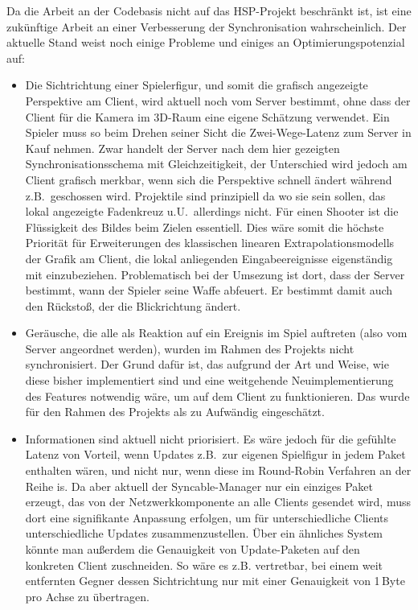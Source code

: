 Da die Arbeit an der Codebasis nicht auf das HSP-Projekt beschränkt ist, ist eine zukünftige Arbeit an einer Verbesserung der Synchronisation wahrscheinlich. Der aktuelle Stand weist noch einige Probleme und einiges an Optimierungspotenzial auf:
\begin{itemize}
\item Die Sichtrichtung einer Spielerfigur, und somit die grafisch angezeigte Perspektive am Client, wird aktuell noch vom Server bestimmt, ohne dass der Client für die Kamera im 3D-Raum eine eigene Schätzung verwendet. 
Ein Spieler muss so beim Drehen seiner Sicht die Zwei-Wege-Latenz zum Server in Kauf nehmen. Zwar handelt der Server nach dem hier gezeigten Synchronisationsschema mit Gleichzeitigkeit, der Unterschied wird jedoch am Client grafisch merkbar, wenn sich die Perspektive schnell ändert während z.B.~geschossen wird. Projektile sind prinzipiell da wo sie sein sollen, das lokal angezeigte Fadenkreuz u.U.~allerdings nicht. Für einen Shooter ist die Flüssigkeit des Bildes  beim Zielen essentiell.
Dies wäre somit die höchste Priorität für Erweiterungen des klassischen linearen Extrapolationsmodells der Grafik am Client, die lokal anliegenden Eingabeereignisse eigenständig mit einzubeziehen. Problematisch bei der Umsezung ist dort, dass der Server bestimmt, wann der Spieler seine Waffe abfeuert. Er bestimmt damit auch den Rückstoß, der die Blickrichtung ändert.
\item Geräusche, die alle als Reaktion auf ein Ereignis im Spiel auftreten (also vom Server angeordnet werden), wurden im Rahmen des Projekts nicht synchronisiert. Der Grund dafür ist, das aufgrund der Art und Weise, wie diese bisher implementiert sind und eine weitgehende Neuimplementierung des Features notwendig wäre, um auf dem Client zu funktionieren. Das wurde für den Rahmen des Projekts als zu Aufwändig eingeschätzt.
\item Informationen sind aktuell nicht priorisiert. Es wäre jedoch für die gefühlte Latenz von Vorteil, wenn Updates z.B.~zur eigenen Spielfigur in jedem Paket enthalten wären, und nicht nur, wenn diese im Round-Robin Verfahren an der Reihe is. Da aber aktuell der Syncable-Manager nur ein einziges Paket erzeugt, das von der Netzwerkkomponente an alle Clients gesendet wird, muss dort eine signifikante Anpassung erfolgen, um für unterschiedliche Clients unterschiedliche Updates zusammenzustellen. Über ein ähnliches System könnte man außerdem die Genauigkeit von Update-Paketen auf den konkreten Client zuschneiden. So wäre es z.B. vertretbar, bei einem weit entfernten Gegner dessen Sichtrichtung nur mit einer Genauigkeit von 1\,Byte pro Achse zu übertragen.

\end{itemize}

